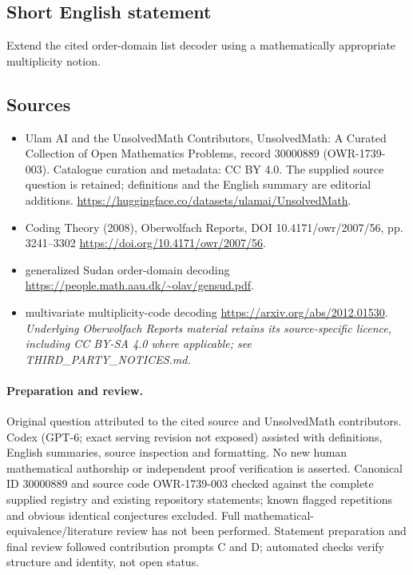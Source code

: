 \documentclass[11pt]{article}
\begin{document}
\subsection{Short English statement}
Extend the cited order-domain list decoder using a mathematically appropriate multiplicity notion.
\subsection{Sources}
\begin{itemize}
\item[\hypertarget{source:30000889:1}{S1}] Ulam AI and the UnsolvedMath Contributors, UnsolvedMath: A Curated Collection of Open Mathematics Problems, record 30000889 (OWR-1739-003). Catalogue curation and metadata: CC BY 4.0. The supplied source question is retained; definitions and the English summary are editorial additions.
\url{https://huggingface.co/datasets/ulamai/UnsolvedMath}.
\item[\hypertarget{source:30000889:2}{S2}] Coding Theory (2008), Oberwolfach Reports, DOI 10.4171/owr/2007/56, pp. 3241--3302
\url{https://doi.org/10.4171/owr/2007/56}.
\item[\hypertarget{source:30000889:3}{S3}] generalized Sudan order-domain decoding
\url{https://people.math.aau.dk/~olav/gensud.pdf}.
\item[\hypertarget{source:30000889:4}{S4}] multivariate multiplicity-code decoding
\url{https://arxiv.org/abs/2012.01530}.
\textit{Underlying Oberwolfach Reports material retains its source-specific licence, including CC BY-SA 4.0 where applicable; see THIRD\_PARTY\_NOTICES.md.}
\end{itemize}
\paragraph{Preparation and review.}
Original question attributed to the cited source and UnsolvedMath contributors. Codex (GPT-6; exact serving revision not exposed) assisted with definitions, English summaries, source inspection and formatting. No new human mathematical authorship or independent proof verification is asserted. Canonical ID 30000889 and source code OWR-1739-003 checked against the complete supplied registry and existing repository statements; known flagged repetitions and obvious identical conjectures excluded. Full mathematical-equivalence/literature review has not been performed. Statement preparation and final review followed contribution prompts C and D; automated checks verify structure and identity, not open status.
\label{end:30000889}
\end{document}
